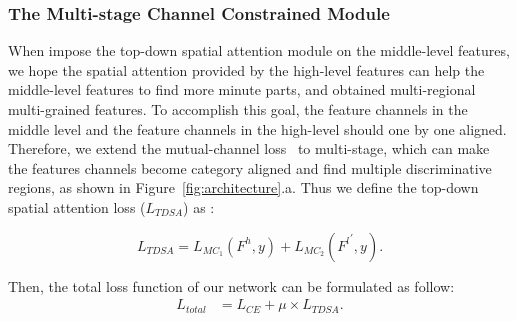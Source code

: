 \documentclass[journal]{IEEEtran}
\begin{document}
\subsubsection{The Multi-stage Channel Constrained Module}
When impose the top-down spatial attention module on the middle-level features, we hope the spatial attention provided by the high-level features can help the middle-level features to find more minute parts, and obtained multi-regional multi-grained features. To accomplish this goal, the feature channels in the middle level and the feature channels in the high-level should one by one aligned. Therefore, we extend the mutual-channel loss~\cite{chang2020mc} to multi-stage, which can make the features channels become category aligned and find multiple discriminative regions, as shown in Figure~\ref{fig:architecture}.a. Thus we define the top-down spatial attention loss ($L_{TDSA}$) as :

\begin{equation}
L_{TDSA} =  L_{{MC}_1}(F^h, y) +  L_{{MC}_2}({F^l}^{\prime},y).
\end{equation}

Then, the total loss function of our network can be formulated as follow:
\begin{equation}
\begin{aligned}
L_{total} & = L_{CE} + {\mu} \times L_{TDSA}. \\
\end{aligned}
\end{equation}




\end{document}

